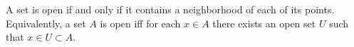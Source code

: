 A set is open if and only if it contains a neighborhood of each of its points. Equivalently, a set $A$ is open iff for each $x \in A$ there exists an open set $U$ such that $x \in U \subset A$.
